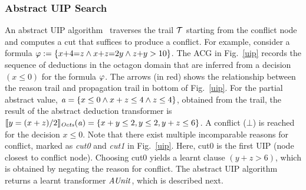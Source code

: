 \subsubsection{Abstract UIP Search}
An abstract UIP algorithm~\cite{DBLP:journals/fmsd/BrainDGHK14} 
traverses the trail $\mathcal{T}$ starting from the conflict node and 
computes a cut that suffices to produce a conflict.  
For example, consider a formula $\varphi:= \{x{+}4{=}z \wedge 
x{+}z{=}2y \wedge z{+}y>10\}$.  The ACG in Fig.~\ref{uip} records the 
sequence of deductions in the octagon domain that are inferred from 
a decision $(x{\leq}0)$ for the formula $\varphi$.  The arrows (in red) 
shows the relationship between the reason trail and propagation trail in 
bottom of Fig.~\ref{uip}.  For the partial abstract value, 
$\mathit{a}=\{x\leq0 \wedge x+z\leq4 \wedge z\leq4\}$, 
obtained from the trail, the result of the abstract deduction transformer is
$\llbracket y=(x+z)/2 \rrbracket_{\mathit{Octs}}(\mathit{a})=\{x+y\leq2, y\leq2, y+z\leq6\}$.
A conflict ($\bot$) is reached for the decision ${x{\leq}0}$.   
Note that there exist multiple incomparable reasons for conflict,
marked as {\em cut0} and {\em cut1} in Fig.~\ref{uip}.  Here, cut0 is 
the first UIP (node closest to conflict node).  Choosing cut0 yields 
a learnt clause $(y+z>6)$, which is obtained by 
negating the reason for conflict.  The abstract UIP algorithm returns a learnt 
transformer $\mathit{AUnit}$, which is described next. 
%    
